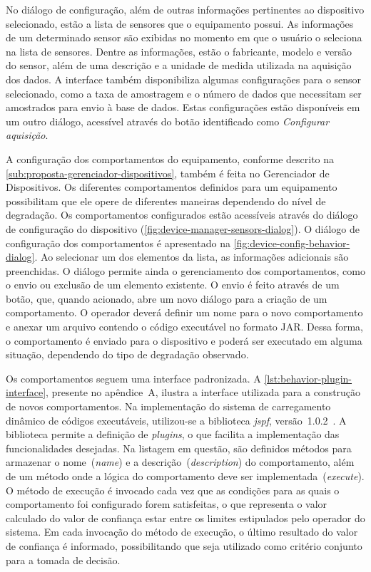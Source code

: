 No diálogo de configuração, além de outras informações pertinentes ao dispositivo selecionado, estão
a lista de sensores que o equipamento possui. As informações de um determinado sensor são exibidas
no momento em que o usuário o seleciona na lista de sensores. Dentre as informações, estão o
fabricante, modelo e versão do sensor, além de uma descrição e a unidade de medida utilizada na
aquisição dos dados. A interface também disponibiliza algumas configurações para o sensor
selecionado, como a taxa de amostragem e o número de dados que necessitam ser amostrados para envio
à base de dados. Estas configurações estão disponíveis em um outro diálogo, acessível através do
botão identificado como \emph{Configurar aquisição}.

A configuração dos comportamentos do equipamento, conforme descrito na
\cref{sub:proposta-gerenciador-dispositivos}, também é feita no Gerenciador de Dispositivos. Os
diferentes comportamentos definidos para um equipamento possibilitam que ele opere de diferentes
maneiras dependendo do nível de degradação. Os comportamentos configurados estão acessíveis através
do diálogo de configuração do dispositivo (\cref{fig:device-manager-sensors-dialog}). O diálogo de
configuração dos comportamentos é apresentado na \cref{fig:device-config-behavior-dialog}. Ao
selecionar um dos elementos da lista, as informações adicionais são preenchidas. O diálogo permite
ainda o gerenciamento dos comportamentos, como o envio ou exclusão de um elemento existente. O envio
é feito através de um botão, que, quando acionado, abre um novo diálogo para a criação de um
comportamento. O operador deverá definir um nome para o novo comportamento e anexar um arquivo
contendo o código executável no formato \gls{JAR}. Dessa forma, o comportamento é enviado para o
dispositivo e poderá ser executado em alguma situação, dependendo do tipo de degradação
observado.

Os comportamentos seguem uma interface padronizada. A \cref{lst:behavior-plugin-interface}, presente
no apêndice~A, ilustra a interface utilizada para a construção de novos comportamentos. Na
implementação do sistema de carregamento dinâmico de códigos executáveis, utilizou-se a biblioteca
\emph{jspf}, versão~1.0.2~\cite{jspf2013homepage}. A biblioteca permite a definição de
\textit{plugins}, o que facilita a implementação das funcionalidades desejadas. Na listagem em
questão, são definidos métodos para armazenar o nome~(\emph{name}) e a
descrição~(\emph{description}) do comportamento, além de um método onde a lógica do comportamento
deve ser implementada~(\emph{execute}). O método de execução é invocado cada vez que as condições
para as quais o comportamento foi configurado forem satisfeitas, o que representa o valor calculado
do valor de confiança estar entre os limites estipulados pelo operador do sistema. Em cada invocação
do método de execução, o último resultado do valor de confiança é informado, possibilitando que seja
utilizado como critério conjunto para a tomada de decisão.

